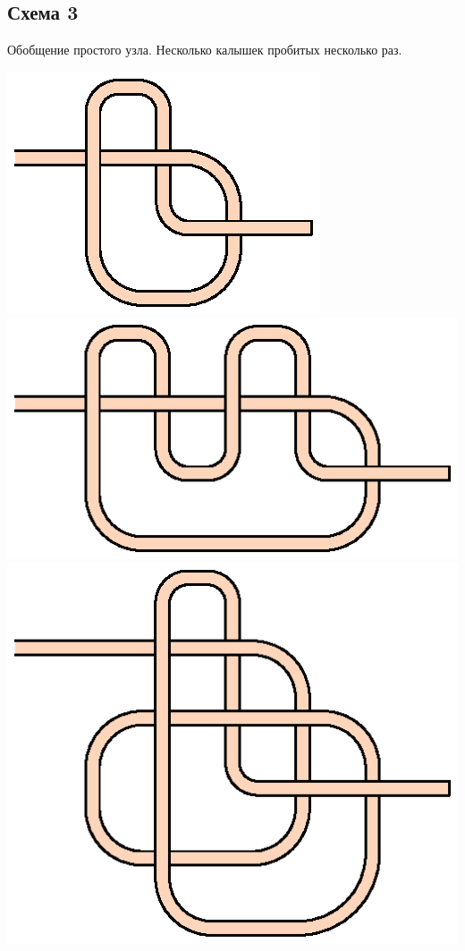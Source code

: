 \subsection{Схема 3}
\graphicspath{{\currentpath}}

Обобщение простого узла. Несколько калышек пробитых несколько раз.

\includegraphics[scale=0.5]{images/s-03-a1b1.eps}
\includegraphics[scale=0.5]{images/s-03-a1b2.eps}
\includegraphics[scale=0.5]{images/s-03-a2b1.eps}

